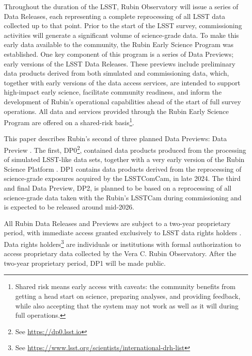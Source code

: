 Throughout the duration of the \gls{LSST},  Rubin Observatory will issue a series of Data Releases, each representing a complete reprocessing of all \gls{LSST} data collected up to that point.
Prior to the start of the \gls{LSST} survey, commissioning activities will generate a significant volume of science-grade data.
To make this early data available to the community, the Rubin Early Science Program \citep{RTN-011} was established.
One key component of this program is a series of Data Previews; early versions of the \gls{LSST} Data Releases.
These previews include preliminary data products derived from both simulated and commissioning data, which, together with early versions of the data access services, are intended to support high-impact early science, facilitate community readiness, and inform the development of Rubin’s operational capabilities ahead of the start of full survey operations.
All data and services provided through the Rubin Early Science Program are offered on a shared-risk basis\footnote{Shared risk means early access with caveats: the community benefits from getting a head start on science, preparing analyses, and providing feedback, while also accepting that the system may not work as well as it will during full operations.}.

This paper describes Rubin's second of three planned Data Previews:  Data Preview \citep[DP1;][]{10.71929/rubin/2570308}.
The first, \gls{DP0}\footnote{See \url{https://dp0.lsst.io}}, contained data products produced from the processing of simulated \gls{LSST}-like data sets, together with a very early version of the Rubin \gls{Science Platform} \citep{LSE-319}.
\gls{DP1} contains data products derived from the reprocessing of science-grade exposures acquired by the \gls{LSSTComCam}, in late 2024.
The third and final Data Preview, \gls{DP2}, is planned to be based on a reprocessing of all science-grade data taken with the Rubin's \gls{LSSTCam} during commissioning and is expected to be released around mid-2026.

All Rubin Data Releases and Previews are subject to a two-year proprietary period, with immediate access granted exclusively to LSST data rights holders \citep{rdo-013}.
Data rights holders\footnote{See \url{https://www.lsst.org/scientists/international-drh-list}} are individuals or institutions with formal authorization to access proprietary data collected by the Vera C. Rubin Observatory.
After the two-year proprietary period, \gls{DP1} will be made public.

